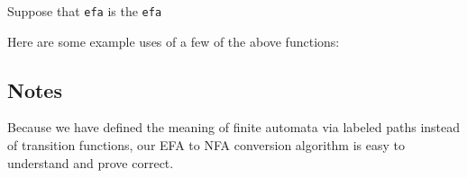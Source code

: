 Suppose that \texttt{efa} is the \texttt{efa}
\begin{center}

\end{center}
Here are some example uses of a few of the above functions:


\subsection{Notes}

Because we have defined the meaning of finite automata via labeled
paths instead of transition functions, our EFA to NFA conversion algorithm
is easy to understand and prove correct.

%
%
%

